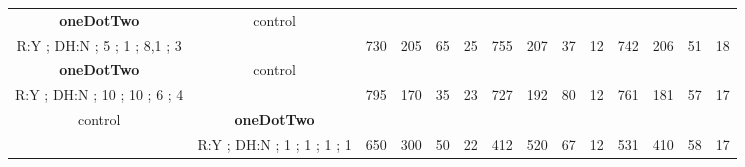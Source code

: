\begin{table}[H]
{\begin{tabular}{|c|c|c|c|c|c|c|c|c|c|c|c|c|c|}
\cellcolor{blue!15}\textbf{oneDotTwo} & control& {\color[HTML]{00009B} } & {\color[HTML]{9A0000} } & {\color[HTML]{009901} } &  & {\color[HTML]{00009B} } & {\color[HTML]{9A0000} } & {\color[HTML]{009901} } &  & {\color[HTML]{00009B} } & {\color[HTML]{9A0000} } & {\color[HTML]{009901} } &  \\ 
\cellcolor{ blue!15}R:Y ; DH:N ; 5 ; 1 ; 8,1 ; 3 &  & \multirow{-2}{*}{{\color[HTML]{00009B} 730}} & \multirow{-2}{*}{{\color[HTML]{9A0000} 205}} & \multirow{-2}{*}{{\color[HTML]{009901} 65}} & \multirow{-2}{*}{25} & \multirow{-2}{*}{{\color[HTML]{00009B} 755}} & \multirow{-2}{*}{{\color[HTML]{9A0000} 207}} & \multirow{-2}{*}{{\color[HTML]{009901} 37}} & \multirow{-2}{*}{12} & \multirow{-2}{*}{{\color[HTML]{00009B} 742}} & \multirow{-2}{*}{{\color[HTML]{9A0000} 206}} & \multirow{-2}{*}{{\color[HTML]{009901} 51}} & \multirow{-2}{*}{18} \\ \hline

\cellcolor{blue!15}\textbf{oneDotTwo} & control& {\color[HTML]{00009B} } & {\color[HTML]{9A0000} } & {\color[HTML]{009901} } &  & {\color[HTML]{00009B} } & {\color[HTML]{9A0000} } & {\color[HTML]{009901} } &  & {\color[HTML]{00009B} } & {\color[HTML]{9A0000} } & {\color[HTML]{009901} } &  \\ 
\cellcolor{ blue!15}R:Y ; DH:N ; 10 ; 10 ; 6 ; 4 &  & \multirow{-2}{*}{{\color[HTML]{00009B} 795}} & \multirow{-2}{*}{{\color[HTML]{9A0000} 170}} & \multirow{-2}{*}{{\color[HTML]{009901} 35}} & \multirow{-2}{*}{23} & \multirow{-2}{*}{{\color[HTML]{00009B} 727}} & \multirow{-2}{*}{{\color[HTML]{9A0000} 192}} & \multirow{-2}{*}{{\color[HTML]{009901} 80}} & \multirow{-2}{*}{12} & \multirow{-2}{*}{{\color[HTML]{00009B} 761}} & \multirow{-2}{*}{{\color[HTML]{9A0000} 181}} & \multirow{-2}{*}{{\color[HTML]{009901} 57}} & \multirow{-2}{*}{17} \\ \hline

control & \cellcolor{blue!15}\textbf{oneDotTwo}& {\color[HTML]{00009B} } & {\color[HTML]{9A0000} } & {\color[HTML]{009901} } &  & {\color[HTML]{00009B} } & {\color[HTML]{9A0000} } & {\color[HTML]{009901} } &  & {\color[HTML]{00009B} } & {\color[HTML]{9A0000} } & {\color[HTML]{009901} } &  \\ 
 & \cellcolor{ blue!15}R:Y ; DH:N ; 1 ; 1 ; 1 ; 1 & \multirow{-2}{*}{{\color[HTML]{00009B} 650}} & \multirow{-2}{*}{{\color[HTML]{9A0000} 300}} & \multirow{-2}{*}{{\color[HTML]{009901} 50}} & \multirow{-2}{*}{22} & \multirow{-2}{*}{{\color[HTML]{00009B} 412}} & \multirow{-2}{*}{{\color[HTML]{9A0000} 520}} & \multirow{-2}{*}{{\color[HTML]{009901} 67}} & \multirow{-2}{*}{12} & \multirow{-2}{*}{{\color[HTML]{00009B} 531}} & \multirow{-2}{*}{{\color[HTML]{9A0000} 410}} & \multirow{-2}{*}{{\color[HTML]{009901} 58}} & \multirow{-2}{*}{17} \\ \hline


\end{tabular}}
\end{table}
